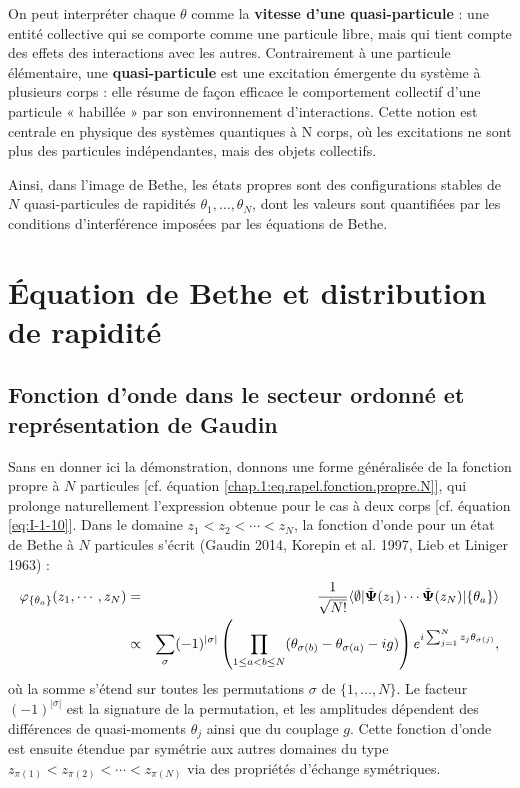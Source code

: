 \medskip

On peut interpréter chaque $\theta$ comme la {\bf vitesse d’une quasi-particule} : une entité collective qui se comporte comme une particule libre, mais qui tient compte des effets des interactions avec les autres. Contrairement à une particule élémentaire, une {\bf quasi-particule} est une excitation émergente du système à plusieurs corps : elle résume de façon efficace le comportement collectif d’une particule « habillée » par son environnement d’interactions. Cette notion est centrale en physique des systèmes quantiques à N corps, où les excitations ne sont plus des particules indépendantes, mais des objets collectifs.

Ainsi, dans l’image de Bethe, les états propres sont des configurations stables de $N$ quasi-particules de rapidités $\theta_1,\dots,\theta_N$, dont les valeurs sont quantifiées par les conditions d’interférence imposées par les équations de Bethe.



\section{Équation de Bethe et distribution de rapidité}

\subsection{Fonction d’onde dans le secteur ordonné et représentation de Gaudin}

Sans en donner ici la démonstration, donnons une forme généralisée de la fonction propre à $N$ particules [cf. équation \eqref{chap.1:eq.rapel.fonction.propre.N}], qui prolonge naturellement l’expression obtenue pour le cas à deux corps [cf. équation \eqref{eq:I-1-10}].
Dans le domaine $z_1 < z_2 < \cdots < z_N$, la fonction d’onde pour un état de Bethe à $N$ particules s’écrit ({\color{blue}Gaudin 2014}, {\color{blue}Korepin et al. 1997}, {\color{black}Lieb et Liniger 1963}) :
\begin{eqnarray}
	\varphi_{\{\theta_a\}} ( z_1 , \cdots , z_N ) & = &  \frac{1}{\sqrt{N!}}\langle \emptyset \vert \hat{\bm{\Psi}} ( z_1 ) \cdots \hat{\bm{\Psi}} (z_N ) \vert \{ \theta_a \} \rangle \notag\\
	& \propto & \sum_\sigma (-1)^{|\sigma|} \left( \prod_{1 \leq a < b \leq N} (\theta_{\sigma(b)} - \theta_{\sigma(a)} - i g) \right) e^{i \sum_{j=1}^{N} z_j \theta_{\sigma(j)}},\label{eq:I-2-17}
\end{eqnarray}
où la somme s'étend sur toutes les permutations $\sigma$ de $\{1,\dots,N\}$. Le facteur $(-1)^{|\sigma|}$ est la signature de la permutation, et les amplitudes dépendent des différences de quasi-moments $\theta_j$ ainsi que du couplage $g$.
Cette fonction d’onde est ensuite étendue par symétrie aux autres domaines du type $z_{\pi(1)} < z_{\pi(2)} < \cdots < z_{\pi(N)}$ via des propriétés d’échange symétriques.

